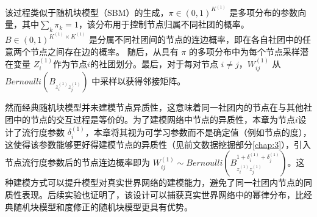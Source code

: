 该过程类似于随机块模型（SBM）的生成，$\pi \in (0,1)^{K^{(1)}}$ 是多项分布的参数向量，其中$\sum_k \pi_k =1$，该分布用于控制节点归属不同社团的概率。$B \in (0,1)^{K^{(1)} \times K^{(1)}}$ 是分属不同社团间的节点的连边概率，即在各自社团中的任意两个节点之间存在边的概率。
随后，从具有 $\pi$ 的多项分布中为每个节点采样潜在变量 $Z_i^{(1)}$作为节点$i$的社团划分。最后，对于每对节点 $i \ne j$，$W^{(1)}_{ij}$ 从 $Bernoulli(B_{z_i^{(1)} z_j^{(1)}})$ 中采样以获得邻接矩阵。

然而经典随机块模型并未建模节点异质性，这意味着同一社团内的节点在与其他社团中的节点的交互过程是等价的。为了建模网络中节点的异质性，本章为节点$i$设计了流行度参数 $\delta^{(1)}_i$，本章将其视为可学习参数而不是确定值（例如节点的度），这使得该参数能够更好得建模节点的异质性（见前文数据挖掘部分\ref{chap:3}），引入节点流行度参数后的节点连边概率即为 $W^{(1)}_{ij} \sim Bernoulli\left(B_{z_i^{(1)} z_j^{(1)}}^{1+\delta_i^{(1)} + \delta_j^{(1)}}\right)$。这种建模方式可以提升模型对真实世界网络的建模能力，避免了同一社团内节点的同质性表现。后续实验也证明了，该设计可以捕获真实世界网络中的幂律分布，比经典随机块模型和度修正的随机块模型更具有优势。


